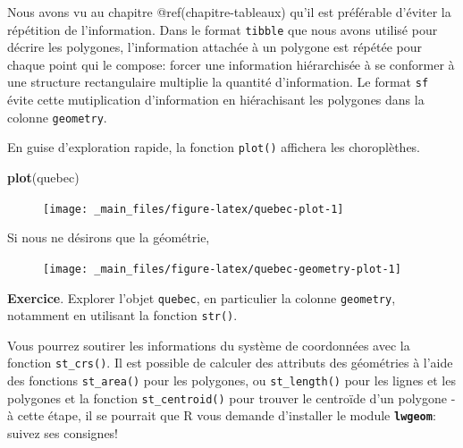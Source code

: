 \documentclass[]{book}
\newenvironment{Shaded}{\begin{snugshade}}{\end{snugshade}}
\newcommand{\CommentTok}[1]{\textcolor[rgb]{0.56,0.35,0.01}{\textit{#1}}}
\newcommand{\KeywordTok}[1]{\textcolor[rgb]{0.13,0.29,0.53}{\textbf{#1}}}
\newcommand{\NormalTok}[1]{#1}
\newcommand{\OperatorTok}[1]{\textcolor[rgb]{0.81,0.36,0.00}{\textbf{#1}}}
\newcommand{\StringTok}[1]{\textcolor[rgb]{0.31,0.60,0.02}{#1}}
\begin{document}
Nous avons vu au chapitre @ref(chapitre-tableaux) qu'il est préférable
d'éviter la répétition de l'information. Dans le format \texttt{tibble}
que nous avons utilisé pour décrire les polygones, l'information
attachée à un polygone est répétée pour chaque point qui le compose:
forcer une information hiérarchisée à se conformer à une structure
rectangulaire multiplie la quantité d'information. Le format \texttt{sf}
évite cette mutiplication d'information en hiérachisant les polygones
dans la colonne \texttt{geometry}.

En guise d'exploration rapide, la fonction \texttt{plot()} affichera les
choroplèthes.

\begin{Shaded}
\begin{Highlighting}[]
\KeywordTok{plot}\NormalTok{(quebec)}
\end{Highlighting}
\end{Shaded}

\begin{figure}

{\centering \texttt{[image: \_main\_files/figure-latex/quebec-plot-1]} 

}

\caption{ }\label{fig:quebec-plot}
\end{figure}

Si nous ne désirons que la géométrie,

\begin{Shaded}
\end{Shaded}

\begin{figure}

{\centering \texttt{[image: \_main\_files/figure-latex/quebec-geometry-plot-1]} 

}

\caption{ }\label{fig:quebec-geometry-plot}
\end{figure}

\textbf{Exercice}. Explorer l'objet \texttt{quebec}, en particulier la
colonne \texttt{geometry}, notamment en utilisant la fonction
\texttt{str()}.

Vous pourrez soutirer les informations du système de coordonnées avec la
fonction \texttt{st\_crs()}. Il est possible de calculer des attributs
des géométries à l'aide des fonctions \texttt{st\_area()} pour les
polygones, ou \texttt{st\_length()} pour les lignes et les polygones et
la fonction \texttt{st\_centroid()} pour trouver le centroïde d'un
polygone - à cette étape, il se pourrait que R vous demande d'installer
le module \textbf{\texttt{lwgeom}}: suivez ses consignes!
\end{document}
